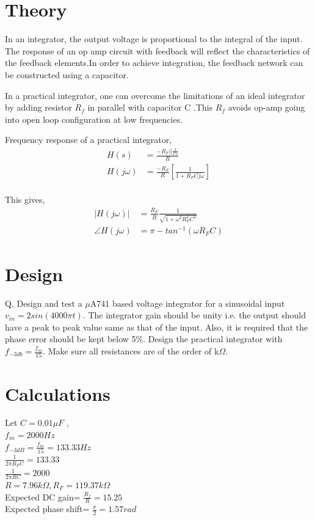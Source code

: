 \documentclass[12pt, titlepage]{article}
\theoremstyle{definition}
\begin{document}
  \newpage
  \section{Theory}
In an integrator, the output voltage is proportional to the integral of the input. The response of an op amp circuit with feedback will reflect the characteristics of the feedback elements.In order to achieve integration, the feedback network can be constructed using a capacitor.
  
  In a practical integrator, one can overcome the limitations of an ideal integrator by adding resistor $R_{f}$ in parallel with capacitor C .This $R_{f}$ avoids op-amp going into open loop configuration at low frequencies.
  
Frequency response of a practical integrator,\\
\begin{align*}
H(s) &=\frac{-R_{F} || \frac{1}{Cs}}{R} \\
H(j\omega)&=\frac{-R_{F}}{R} \left[ \frac{1}{1+R_{F}Cj\omega} \right] \\
\end{align*}

This gives,
\begin{align*}
|H(j\omega)|&=\frac{R_{F}}{R}\frac{1}{\sqrt{1+\omega^{2}R_{F}^{2}C^{2}}} \\
\angle H(j\omega) &= \pi - tan^{-1}(\omega R_{F}C)
\end{align*}
  
  

  \newpage
  \section{Design}
  Q. Design and test a $\mu$A741 based voltage integrator for a sinusoidal input $v_{in}=2sin(4000\pi t)$.
  The integrator gain should be unity i.e. the output should have a peak to peak value same as that of the input. Also, it is required that the phase error should be kept below 5\%.
  Design the practical integrator with $f_{-3db} = \frac{f_{in}}{15}$.
   Make sure all resistances are of the order of k$\Omega$.
  
  

  \section{Calculations}
  Let $C=0.01\mu F$ , \\
  $f_{in}=2000 Hz$\\
  $f_{-3dB}=\frac{f_{in}}{15} = 133.33 Hz$ \\
  $\frac{1}{2\pi R_{F}C} = 133.33$\\
  $\frac{1}{2\pi RC} = 2000$\\
  $R=7.96k\Omega, R_{F}=119.37k\Omega$\\
  Expected DC gain= $\frac{R_{f}}{R}=15.25$\\
  Expected phase shift= $\frac{\pi}{2}=1.57 rad$
  
\end{document}
